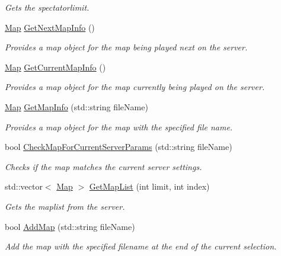 \begin{DoxyCompactItemize}
\begin{DoxyCompactList}\small\item\em Gets the spectatorlimit. \end{DoxyCompactList}\item 
\hypertarget{classMethods_afa0e3e406c14aad10521d4d6c6333a70}{\hyperlink{structMap}{Map} \hyperlink{classMethods_afa0e3e406c14aad10521d4d6c6333a70}{Get\-Next\-Map\-Info} ()}\label{classMethods_afa0e3e406c14aad10521d4d6c6333a70}

\begin{DoxyCompactList}\small\item\em Provides a map object for the map being played next on the server. \end{DoxyCompactList}\item 
\hyperlink{structMap}{Map} \hyperlink{classMethods_a4c8c8afabea84f839091c2a5a79b477d}{Get\-Current\-Map\-Info} ()
\begin{DoxyCompactList}\small\item\em Provides a map object for the map currently being played on the server. \end{DoxyCompactList}\item 
\hyperlink{structMap}{Map} \hyperlink{classMethods_a3a64508bc62765212bcf0d032b4f47ac}{Get\-Map\-Info} (std\-::string file\-Name)
\begin{DoxyCompactList}\small\item\em Provides a map object for the map with the specified file name. \end{DoxyCompactList}\item 
bool \hyperlink{classMethods_a93ac30a58c96f2635fef8f05b27a7864}{Check\-Map\-For\-Current\-Server\-Params} (std\-::string file\-Name)
\begin{DoxyCompactList}\small\item\em Checks if the map matches the current server settings. \end{DoxyCompactList}\item 
std\-::vector$<$ \hyperlink{structMap}{Map} $>$ \hyperlink{classMethods_ad30f67839b950d23c566535f43afefb4}{Get\-Map\-List} (int limit, int index)
\begin{DoxyCompactList}\small\item\em Gets the maplist from the server. \end{DoxyCompactList}\item 
bool \hyperlink{classMethods_aac29fafb7a9f491c64c24a5e24754f71}{Add\-Map} (std\-::string file\-Name)
\begin{DoxyCompactList}\small\item\em Add the map with the specified filename at the end of the current selection. \end{DoxyCompactList}\item 

\end{DoxyCompactItemize}
